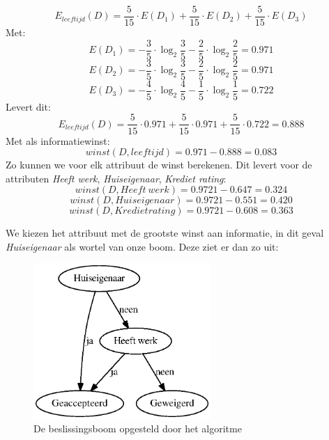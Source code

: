 \begin{equation}
E_{leeftijd}(D) = \frac{5}{15} \cdot E(D_1) + \frac{5}{15} \cdot E(D_2) + \frac{5}{15} \cdot E(D_3)  
\end{equation}
Met:
\begin{equation}
E(D_1) = -\frac{3}{5} \cdot \log_2 \frac{3}{5} - \frac{2}{5} \cdot \log_2 \frac{2}{5} = 0.971
\end{equation}
\begin{equation}
E(D_2) = -\frac{3}{5} \cdot \log_2 \frac{3}{5} - \frac{2}{5} \cdot \log_2 \frac{2}{5} = 0.971
\end{equation}
\begin{equation}
E(D_3) = -\frac{4}{5} \cdot \log_2 \frac{4}{5} - \frac{1}{5} \cdot \log_2 \frac{1}{5} = 0.722
\end{equation}
Levert dit:
\begin{equation}
E_{leeftijd}(D) = \frac{5}{15} \cdot 0.971 + \frac{5}{15} \cdot 0.971 + \frac{5}{15} \cdot 0.722 = 0.888
\end{equation}
Met als informatiewinst:
\begin{equation}
winst(D,leeftijd) = 0.971 - 0.888 = 0.083
\end{equation}
Zo kunnen we voor elk attribuut de winst berekenen. Dit levert voor de attributen \emph{Heeft werk}, \emph{Huiseigenaar}, \emph{Krediet rating}:
\begin{equation}
winst(D,Heeft\ werk) = 0.9721 -  0.647 = 0.324
\end{equation}
\begin{equation}
winst(D,Huiseigenaar) = 0.9721 -  0.551 = 0.420
\end{equation}
\begin{equation}
winst(D,Krediet rating) = 0.9721 - 0.608 = 0.363
\end{equation}

We kiezen het attribuut met de grootste winst aan informatie, in dit geval \emph{Huiseigenaar} als wortel van onze boom. Deze ziet er dan zo uit:

\begin{figure}[h]
\centering
\includegraphics[width=0.6\textwidth]{res/ch5_dt_vb2.eps}
\caption{De beslissingsboom opgesteld door het algoritme}
\end{figure}

